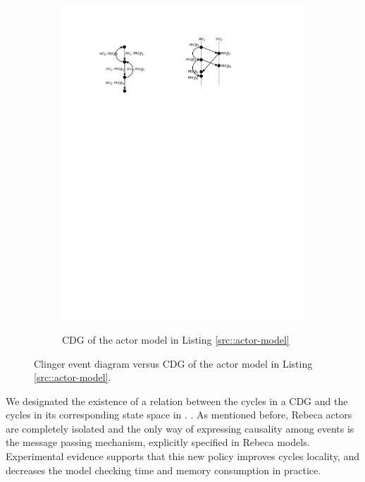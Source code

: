 \begin{figure}
\begin{subfigure}[b]{0.2\textwidth}
  \centering
  \small{
   \includegraphics[width=.8\textwidth]{resources/cdg.pdf}
  }
  \caption{CDG of the actor model in Listing \ref{src::actor-model}}
  \label{fig::cdg}
\end{subfigure}
\caption{Clinger event diagram versus CDG of the actor model in Listing \ref{src::actor-model}.}
\label{fig::clinger-cdg}
\end{figure}

We designated the existence of a relation between the cycles in a CDG and the cycles in its corresponding state space in \cite{DBLP:journals/eceasst/KhamespanahSMSR15}. . 
As mentioned before, Rebeca actors are completely isolated and the only way of expressing causality among events is the message passing mechanism, explicitly specified in Rebeca models. Experimental evidence supports that this new policy improves cycles locality, and decreases the model checking time and memory consumption in practice.